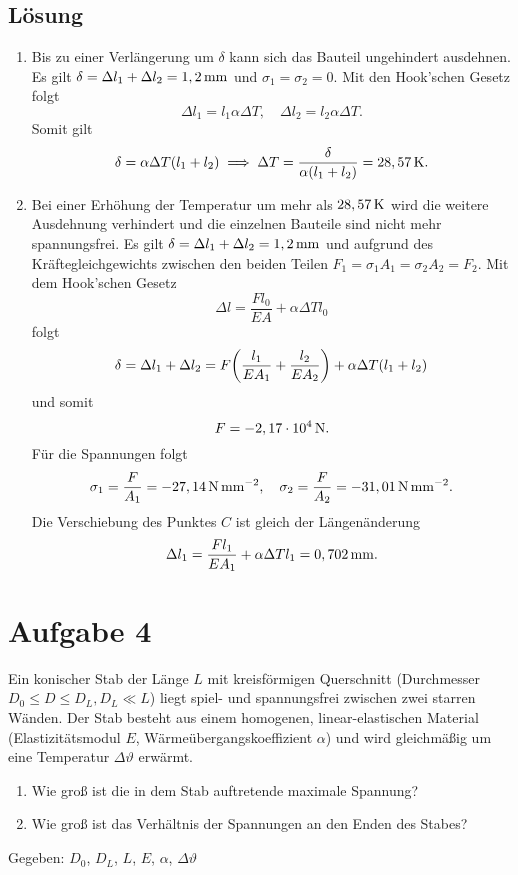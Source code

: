 \documentclass{exercise}
\begin{document}
    \subsection*{Lösung}
    \begin{enumerate}
        \item Bis zu einer Verlängerung um \(\delta\) kann sich das Bauteil ungehindert ausdehnen.
        Es gilt \(\delta = \Delta l_1 + \Delta l_2 = 1,2\,\si{\milli\meter}\) und \(\sigma_1 = \sigma_2 = 0\).
        Mit den Hook'schen Gesetz folgt
        \[
            \Delta l_1 = l_1\alpha\Delta T, \quad \Delta l_2 = l_2\alpha\Delta T.
        \]
        Somit gilt
        \[
            \delta = \alpha\Delta T\parentheses*{l_1 + l_2} \implies \Delta T = \frac{\delta}{\alpha\parentheses*{l_1 + l_2}} = 28,57\sis{\kelvin}.
        \]
        \item Bei einer Erhöhung der Temperatur um mehr als \(28,57\,\si{\kelvin}\) wird die weitere Ausdehnung verhindert und die einzelnen Bauteile sind nicht mehr spannungsfrei.
        Es gilt \(\delta = \Delta l_1 + \Delta l_2 = 1,2\,\si{\milli\meter}\) und aufgrund des Kräftegleichgewichts zwischen den beiden Teilen \(F_1 = \sigma_1 A_1 = \sigma_2 A_2 = F_2\).
        Mit dem Hook'schen Gesetz
        \[
            \Delta l = \frac{Fl_0}{EA} + \alpha\Delta Tl_0
        \]
        folgt
        \[
            \delta = \Delta l_1 + \Delta l_2 = F\parentheses*{\frac{l_1}{EA_1} + \frac{l_2}{EA_2}} + \alpha\Delta T\parentheses*{l_1 + l_2}
        \]
        und somit
        \[
            F = -2,17 \cdot 10^4\,\si{\newton}.
        \]
        Für die Spannungen folgt
        \[
            \sigma_1 = \frac{F}{A_1} = -27,14\,\si{\newton\per\milli\meter\squared}, \quad \sigma_2 = \frac{F}{A_2} = -31,01\,\si{\newton\per\milli\meter\squared}.
        \]
        Die Verschiebung des Punktes \(C\) ist gleich der Längenänderung
        \[
            \Delta l_1 = \frac{Fl_1}{EA_1} + \alpha\Delta Tl_1 = 0,702\,\si{\milli\meter}.
        \]
    \end{enumerate}


    \section*{Aufgabe 4}

    \begin{problem}
        Ein konischer Stab der Länge \(L\) mit kreisförmigen Querschnitt (Durchmesser \(D_0 \le D \le D_L, D_L \ll L\)) liegt spiel- und spannungsfrei zwischen zwei starren Wänden.
        Der Stab besteht aus einem homogenen, linear-elastischen Material (Elastizitätsmodul \(E\), Wärmeübergangskoeffizient \(\alpha\)) und wird gleichmäßig um eine Temperatur \(\Delta \vartheta\) erwärmt.
        \begin{enumerate}
            \item Wie groß ist die in dem Stab auftretende maximale Spannung?
            \item Wie groß ist das Verhältnis der Spannungen an den Enden des Stabes?
        \end{enumerate}
        Gegeben: \(D_0\), \(D_L\), \(L\), \(E\), \(\alpha\), \(\Delta\vartheta\)
    \end{problem}
\end{document}
